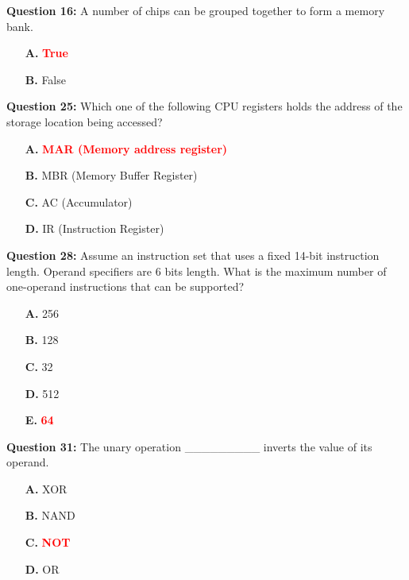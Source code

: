 \documentclass[12pt,a4paper]{article}
\begin{document}
\vspace{0.5cm}

\textbf{Question 16:} A number of chips can be grouped together to form a memory bank.

\begin{itemize}
    \item[\textbf{A.}] \textcolor{red}{\textbf{True}}
    \item[\textbf{B.}] False
\end{itemize}

\vspace{0.5cm}

\textbf{Question 25:} Which one of the following CPU registers holds the address of the storage location being accessed?

\begin{itemize}
    \item[\textbf{A.}] \textcolor{red}{\textbf{MAR (Memory address register)}}
    \item[\textbf{B.}] MBR (Memory Buffer Register)
    \item[\textbf{C.}] AC (Accumulator)
    \item[\textbf{D.}] IR (Instruction Register)
\end{itemize}

\vspace{0.5cm}

\textbf{Question 28:} Assume an instruction set that uses a fixed 14-bit instruction length. Operand specifiers are 6 bits length. What is the maximum number of one-operand instructions that can be supported?

\begin{itemize}
    \item[\textbf{A.}] 256
    \item[\textbf{B.}] 128
    \item[\textbf{C.}] 32
    \item[\textbf{D.}] 512
    \item[\textbf{E.}] \textcolor{red}{\textbf{64}}
\end{itemize}

\vspace{0.5cm}

\textbf{Question 31:} The unary operation _________ inverts the value of its operand.

\begin{itemize}
    \item[\textbf{A.}] XOR
    \item[\textbf{B.}] NAND
    \item[\textbf{C.}] \textcolor{red}{\textbf{NOT}}
    \item[\textbf{D.}] OR
\end{itemize}
\end{document}
